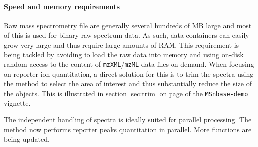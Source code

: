 \paragraph{Speed and memory requirements} Raw mass spectrometry file are generally several 
hundreds of MB large and most of this is used for binary raw spectrum data. As such, 
data containers can easily grow very large and thus require large amounts of RAM. 
This requirement is being tackled by avoiding to load the raw data into memory
and using on-disk random access to the content of \texttt{mzXML}/\texttt{mzML} data files on demand. 
When focusing on reporter ion quantitation, a direct solution for this is to trim the 
spectra using the  method to select the area of interest and thus 
substantially reduce the size of the  objects. This is illustrated in 
section \ref{sec:trim} on page \pageref{trimMz-example} of the \texttt{MSnbase-demo} vignette.

The independent handling of spectra is ideally suited for parallel processing. 
The  method now performs reporter peaks quantitation in parallel. 
More functions are being updated.




